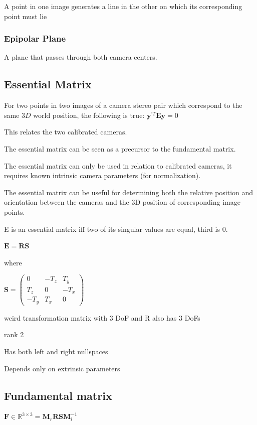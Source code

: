 A point in one image generates a line in the other on which its corresponding point must lie

\subsubsection{Epipolar Plane}

A plane that passes through both camera centers.

\subsection{Essential Matrix}

For two points in two images of a camera stereo pair which correspond to the same $3D$ world position, the following is true: 
$\mathbf{y}^{\prime T}\mathbf{Ey}=0$

This relates the two calibrated cameras.

The essential matrix can be seen as a precursor to the fundamental matrix. 

The essential matrix can only be used in relation to calibrated cameras, it requires known intrinsic camera parameters (for normalization).

The essential matrix can be useful for determining both the relative position and orientation between the cameras and the 3D position of corresponding image points.

 E is an essential matrix iff two of its singular values are equal, third is 0.

$\mathbf{E}=\mathbf{RS}$

where 

$\mathbf{S} = \left( \begin{matrix} 0 & -T_z & T_y \\ T_z & 0 & -T_x \\ -T_y & T_x & 0  \end{matrix} \right)$

weird transformation matrix with 3 DoF and R also has 3 DoFs

rank 2 

Has both left and right nullspaces

Depends only on extrinsic parameters

\subsection{ Fundamental matrix}

$\mathbf F \in \mathbb{R}^{3\times3} = \mathbf{M}_r\mathbf{RSM}_l^{-1}$ 


